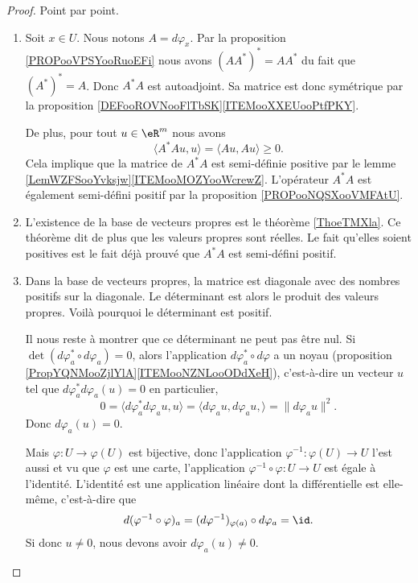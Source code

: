 \begin{proof}
	Point par point.
	\begin{enumerate}
		\item
		      Soit \( x\in U\). Nous notons \( A=d\varphi_x\). Par la proposition \ref{PROPooVPSYooRuoEFi} nous avons \( (AA^*)^*=AA^*\) du fait que \( (A^*)^*=A\). Donc \( A^*A\) est autoadjoint. Sa matrice est donc symétrique par la proposition \ref{DEFooROVNooFlTbSK}\ref{ITEMooXXEUooPtfPKY}.

		      De plus, pour tout \( u\in \eR^m\) nous avons
		      \begin{equation}
			      \langle A^*Au, u\rangle =\langle Au, Au\rangle \geq 0.
		      \end{equation}
		      Cela implique que la matrice de \( A^*A\) est semi-définie positive par le lemme \ref{LemWZFSooYvksjw}\ref{ITEMooMOZYooWcrewZ}. L'opérateur \( A^*A\) est également semi-défini positif par la proposition \ref{PROPooNQSXooVMFAtU}.
		\item
		      L'existence de la base de vecteurs propres est le théorème \ref{ThoeTMXla}. Ce théorème dit de plus que les valeurs propres sont réelles. Le fait qu'elles soient positives est le fait déjà prouvé que \( A^*A\) est semi-défini positif.
		\item
		      Dans la base de vecteurs propres, la matrice est diagonale avec des nombres positifs sur la diagonale. Le déterminant est alors le produit des valeurs propres. Voilà pourquoi le déterminant est positif.

		      Il nous reste à montrer que ce déterminant ne peut pas être nul. Si \( \det(d\varphi_a^*\circ d\varphi_a)=0\), alors l'application \( d\varphi_a^*\circ d\varphi\) a un noyau (proposition \ref{PropYQNMooZjlYlA}\ref{ITEMooNZNLooODdXeH}), c'est-à-dire un vecteur \( u\) tel que \( d\varphi_a^*d\varphi_a(u)=0\) en particulier,
		      \begin{equation}
			      0=\langle d\varphi_a^*d\varphi_au, u\rangle =\langle d\varphi_au,d\varphi_au, \rangle =\| d\varphi_au \|^2.
		      \end{equation}
		      Donc \( d\varphi_a(u)=0\).

		      Mais \( \varphi\colon U\to \varphi(U)\) est bijective, donc l'application \( \varphi^{-1}\colon \varphi(U)\to U\) l'est aussi et vu que \( \varphi\) est une carte, l'application \( \varphi^{-1}\circ\varphi\colon U\to U\) est égale à l'identité. L'identité est une application linéaire dont la différentielle est elle-même, c'est-à-dire que
		      \begin{equation}
			      d(\varphi^{-1}\circ\varphi)_a=(d\varphi^{-1})_{\varphi(a)}\circ d\varphi_a=\id.
		      \end{equation}
		      Si donc \( u\neq 0\), nous devons avoir \( d\varphi_a(u)\neq 0\).
	\end{enumerate}
\end{proof}

